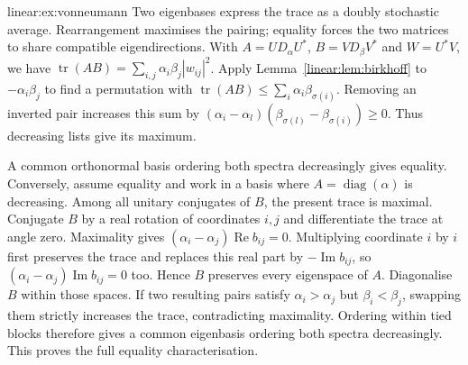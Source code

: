 \begin{solution}{linear:ex:vonneumann}
\idea Two eigenbases express the trace as a doubly stochastic average. Rearrangement maximises the pairing; equality forces the two matrices to share compatible eigendirections.
\writeup With $A=UD_\alpha U^*$, $B=VD_\beta V^*$ and $W=U^*V$, we have $\operatorname{tr}(AB)=\sum_{i,j}\alpha_i\beta_j|w_{ij}|^2$. Apply Lemma~\ref{linear:lem:birkhoff} to $-\alpha_i\beta_j$ to find a permutation with $\operatorname{tr}(AB)\le\sum_i\alpha_i\beta_{\sigma(i)}$. Removing an inverted pair increases this sum by $(\alpha_i-\alpha_l)(\beta_{\sigma(l)}-\beta_{\sigma(i)})\ge0$. Thus decreasing lists give its maximum.

A common orthonormal basis ordering both spectra decreasingly gives equality. Conversely, assume equality and work in a basis where $A=\operatorname{diag}(\alpha)$ is decreasing. Among all unitary conjugates of $B$, the present trace is maximal. Conjugate $B$ by a real rotation of coordinates $i,j$ and differentiate the trace at angle zero. Maximality gives $(\alpha_i-\alpha_j)\operatorname{Re}b_{ij}=0$. Multiplying coordinate $i$ by $i$ first preserves the trace and replaces this real part by $-\operatorname{Im}b_{ij}$, so $(\alpha_i-\alpha_j)\operatorname{Im}b_{ij}=0$ too. Hence $B$ preserves every eigenspace of $A$. Diagonalise $B$ within those spaces. If two resulting pairs satisfy $\alpha_i>\alpha_j$ but $\beta_i<\beta_j$, swapping them strictly increases the trace, contradicting maximality. Ordering within tied blocks therefore gives a common eigenbasis ordering both spectra decreasingly. This proves the full equality characterisation.
\end{solution}


